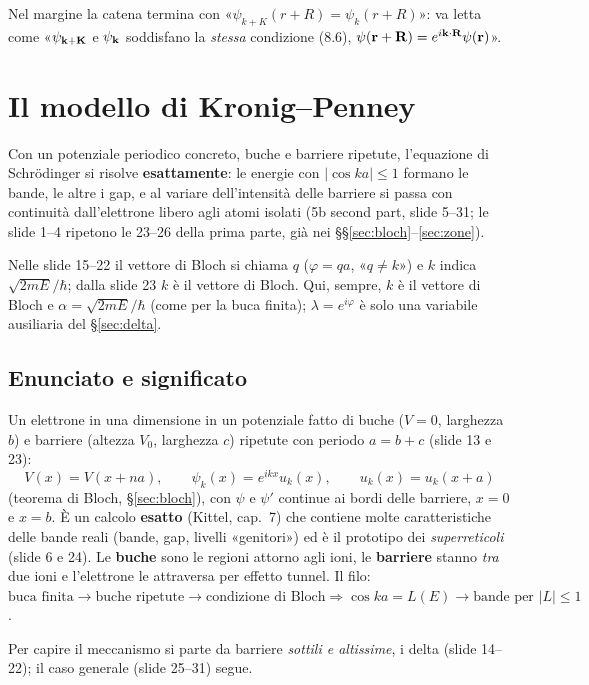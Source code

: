 \documentclass[11pt,a4paper]{article}
\begin{document}
\begin{osservazione}
Nel margine la catena termina con «$\psi_{k+K}(r+R)=\psi_k(r+R)$»: va letta come «$\psi_{\mathbf k+\mathbf K}$ e $\psi_{\mathbf k}$ soddisfano la \emph{stessa}
condizione (8.6), $\psi(\mathbf r+\mathbf R)=e^{i\mathbf k\cdot\mathbf R}\psi(\mathbf r)$».
\end{osservazione}

\section{Il modello di Kronig--Penney}\label{sec:kp}
Con un potenziale periodico concreto, buche e barriere ripetute, l'equazione di Schrödinger si risolve \textbf{esattamente}: le energie con
$|\cos ka|\le1$ formano le bande, le altre i gap, e al variare dell'intensità delle barriere si passa con continuità dall'elettrone libero agli atomi
isolati (5b second part, slide 5--31; le slide 1--4 ripetono le 23--26 della prima parte, già nei §§\ref{sec:bloch}--\ref{sec:zone}).

\begin{osservazione}[notazione]
Nelle slide 15--22 il vettore di Bloch si chiama $q$ ($\varphi=qa$, «$q\ne k$») e $k$ indica $\sqrt{2mE}/\hbar$; dalla slide 23 $k$ è il vettore di
Bloch. Qui, sempre, $k$ è il vettore di Bloch e $\alpha=\sqrt{2mE}/\hbar$ (come per la buca finita); $\lambda=e^{i\varphi}$ è solo una variabile
ausiliaria del §\ref{sec:delta}.
\end{osservazione}

\subsection{Enunciato e significato}
\begin{modello}\label{mod:kp}
Un elettrone in una dimensione in un potenziale fatto di buche ($V=0$, larghezza $b$) e barriere (altezza $V_0$, larghezza $c$) ripetute con periodo
$a=b+c$ (slide 13 e 23):
\[
V(x)=V(x+na),\qquad \psi_k(x)=e^{ikx}u_k(x),\qquad u_k(x)=u_k(x+a)
\]
(teorema di Bloch, §\ref{sec:bloch}), con $\psi$ e $\psi'$ continue ai bordi delle barriere, $x=0$ e $x=b$.
\tcblower
È un calcolo \textbf{esatto} (Kittel, cap.~7) che contiene molte caratteristiche delle bande reali (bande, gap, livelli «genitori») ed è il prototipo dei
\emph{superreticoli}  (slide 6 e 24). Le \textbf{buche} sono le regioni attorno agli ioni, le \textbf{barriere} stanno \emph{tra} due ioni
e l'elettrone le attraversa per effetto tunnel. Il filo:
$\text{buca finita}\to\text{buche ripetute}\to\text{condizione di Bloch}\Rightarrow\cos ka=L(E)\to\text{bande per }|L|\le1$.
\end{modello}
Per capire il meccanismo si parte da barriere \emph{sottili e altissime}, i delta (slide 14--22); il caso generale (slide 25--31) segue.
\end{document}
